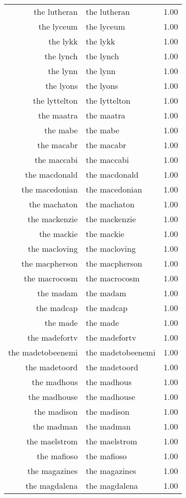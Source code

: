 \begin{table}[ht]
\begin{tabular}{rlr}
  the lutheran & the lutheran & 1.00 \\ 
  the lyceum & the lyceum & 1.00 \\ 
  the lykk & the lykk & 1.00 \\ 
  the lynch & the lynch & 1.00 \\ 
  the lynn & the lynn & 1.00 \\ 
  the lyons & the lyons & 1.00 \\ 
  the lyttelton & the lyttelton & 1.00 \\ 
  the maatra & the maatra & 1.00 \\ 
  the mabe & the mabe & 1.00 \\ 
  the macabr & the macabr & 1.00 \\ 
  the maccabi & the maccabi & 1.00 \\ 
  the macdonald & the macdonald & 1.00 \\ 
  the macedonian & the macedonian & 1.00 \\ 
  the machaton & the machaton & 1.00 \\ 
  the mackenzie & the mackenzie & 1.00 \\ 
  the mackie & the mackie & 1.00 \\ 
  the macloving & the macloving & 1.00 \\ 
  the macpherson & the macpherson & 1.00 \\ 
  the macrocosm & the macrocosm & 1.00 \\ 
  the madam & the madam & 1.00 \\ 
  the madcap & the madcap & 1.00 \\ 
  the made & the made & 1.00 \\ 
  the madefortv & the madefortv & 1.00 \\ 
  the madetobeenemi & the madetobeenemi & 1.00 \\ 
  the madetoord & the madetoord & 1.00 \\ 
  the madhous & the madhous & 1.00 \\ 
  the madhouse & the madhouse & 1.00 \\ 
  the madison & the madison & 1.00 \\ 
  the madman & the madman & 1.00 \\ 
  the maelstrom & the maelstrom & 1.00 \\ 
  the mafioso & the mafioso & 1.00 \\ 
  the magazines & the magazines & 1.00 \\ 
  the magdalena & the magdalena & 1.00 \\ 

\end{tabular}
\end{table}
